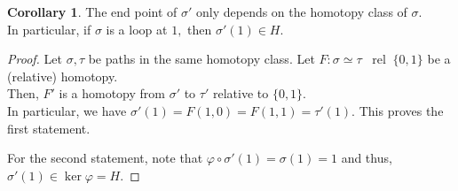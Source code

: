 \documentclass[12pt]{article}
\theoremstyle{definition}
\numberwithin{thm}{section}
\newtheorem{cor}[thm]{Corollary}
\newcommand{\rel}{\;\;\operatorname{rel}\;}
\begin{document}
\begin{cor} \label{cor:endpthomot}
	The end point of $\sigma'$ only depends on the homotopy class of $\sigma.$\\
	In particular, if $\sigma$ is a loop at $1,$ then $\sigma'(1) \in H.$
\end{cor}
\begin{proof} 
	Let $\sigma, \tau$ be paths in the same homotopy class. Let $F:\sigma \simeq \tau \rel \{0, 1\}$ be a (relative) homotopy.\\
	Then, $F'$ is a homotopy from $\sigma'$ to $\tau'$ relative to $\{0, 1\}.$\\
	In particular, we have $\sigma'(1) = F(1, 0) = F(1, 1) = \tau'(1).$ This proves the first statement.

	For the second statement, note that $\varphi\circ\sigma'(1) = \sigma(1) = 1$ and thus, $\sigma'(1) \in \ker\varphi = H.$
\end{proof}
\end{document}
